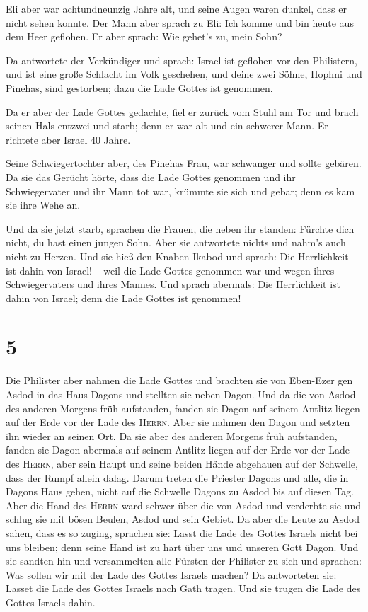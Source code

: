  Eli aber war achtundneunzig Jahre alt, und seine Augen
waren dunkel, dass er nicht sehen konnte.  Der Mann aber
sprach zu Eli: Ich komme und bin heute aus dem Heer geflohen. Er aber
sprach: Wie gehet's zu, mein Sohn?

 Da antwortete der Verkündiger und sprach: Israel ist
geflohen vor den Philistern, und ist eine große Schlacht im Volk
geschehen, und deine zwei Söhne, Hophni und Pinehas, sind gestorben;
dazu die Lade Gottes ist genommen.

 Da er aber der Lade Gottes gedachte, fiel er zurück vom
Stuhl am Tor und brach seinen Hals entzwei und starb; denn er war alt
und ein schwerer Mann. Er richtete aber Israel 40 Jahre.

 Seine Schwiegertochter aber, des Pinehas Frau, war
schwanger und sollte gebären. Da sie das Gerücht hörte, dass die Lade
Gottes genommen und ihr Schwiegervater und ihr Mann tot war, krümmte sie
sich und gebar; denn es kam sie ihre Wehe an.

 Und da sie jetzt starb, sprachen die Frauen, die neben
ihr standen: Fürchte dich nicht, du hast einen jungen Sohn. Aber sie
antwortete nichts und nahm's auch nicht zu Herzen.  Und
sie hieß den Knaben Ikabod und sprach: Die Herrlichkeit ist dahin von
Israel! -- weil die Lade Gottes genommen war und wegen ihres
Schwiegervaters und ihres Mannes.  Und sprach abermals:
Die Herrlichkeit ist dahin von Israel; denn die Lade Gottes ist
genommen!

\hypertarget{section-4}{%
\section{5}\label{section-4}}

 Die Philister aber nahmen die Lade Gottes und brachten
sie von Eben-Ezer gen Asdod  in das Haus Dagons und
stellten sie neben Dagon.  Und da die von Asdod des
anderen Morgens früh aufstanden, fanden sie Dagon auf seinem Antlitz
liegen auf der Erde vor der Lade des \textsc{Herrn}. Aber sie nahmen den
Dagon und setzten ihn wieder an seinen Ort.  Da sie aber
des anderen Morgens früh aufstanden, fanden sie Dagon abermals auf
seinem Antlitz liegen auf der Erde vor der Lade des \textsc{Herrn}, aber
sein Haupt und seine beiden Hände abgehauen auf der Schwelle, dass der
Rumpf allein dalag.  Darum treten die Priester Dagons und
alle, die in Dagons Haus gehen, nicht auf die Schwelle Dagons zu Asdod
bis auf diesen Tag.  Aber die Hand des \textsc{Herrn} ward
schwer über die von Asdod und verderbte sie und schlug sie mit bösen
Beulen, Asdod und sein Gebiet.  Da aber die Leute zu Asdod
sahen, dass es so zuging, sprachen sie: Lasst die Lade des Gottes
Israels nicht bei uns bleiben; denn seine Hand ist zu hart über uns und
unseren Gott Dagon.  Und sie sandten hin und versammelten
alle Fürsten der Philister zu sich und sprachen: Was sollen wir mit der
Lade des Gottes Israels machen? Da antworteten sie: Lasset die Lade des
Gottes Israels nach Gath tragen. Und sie trugen die Lade des Gottes
Israels dahin.

